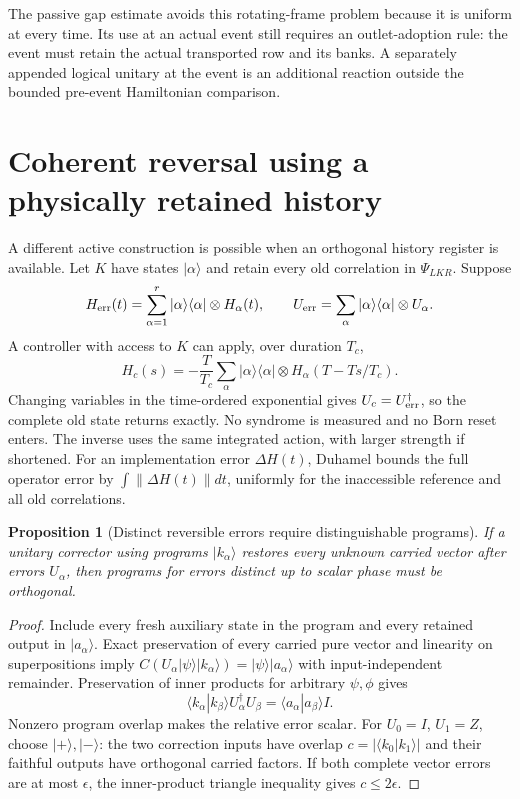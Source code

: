 \documentclass[11pt,oneside,openany]{book}
\newtheorem{proposition}[theorem]{Proposition}
\theoremstyle{definition}
\theoremstyle{remark}\newtheorem{remark}[theorem]{Remark}
\begin{document}
The passive gap estimate avoids this rotating-frame problem because it is uniform at every time. Its use at an actual event still requires an outlet-adoption rule: the event must retain the actual transported row and its banks. A separately appended logical unitary at the event is an additional reaction outside the bounded pre-event Hamiltonian comparison.

\section{Coherent reversal using a physically retained history}

A different active construction is possible when an orthogonal history register is available. Let $K$ have states $|\alpha\rangle$ and retain every old correlation in $\Psi_{LKR}$. Suppose
\[
 H_{\rm err}(t)=\sum_{\alpha=1}^r|\alpha\rangle\langle\alpha|\otimes H_\alpha(t),
 \qquad U_{\rm err}=\sum_\alpha|\alpha\rangle\langle\alpha|\otimes U_\alpha.
\]
A controller with access to $K$ can apply, over duration $T_c$,
\[
 H_c(s)=-\frac T{T_c}\sum_\alpha|\alpha\rangle\langle\alpha|
             \otimes H_\alpha(T-Ts/T_c).
\]
Changing variables in the time-ordered exponential gives $U_c=U_{\rm err}^\dagger$, so the complete old state returns exactly. No syndrome is measured and no Born reset enters. The inverse uses the same integrated action, with larger strength if shortened. For an implementation error $\Delta H(t)$, Duhamel bounds the full operator error by $\int\|\Delta H(t)\|dt$, uniformly for the inaccessible reference and all old correlations.

\begin{proposition}[Distinct reversible errors require distinguishable programs]
\label{prot:programs}
If a unitary corrector using programs $|k_\alpha\rangle$ restores every unknown carried vector after errors $U_\alpha$, then programs for errors distinct up to scalar phase must be orthogonal.
\end{proposition}
\begin{proof}
Include every fresh auxiliary state in the program and every retained output in $|a_\alpha\rangle$. Exact preservation of every carried pure vector and linearity on superpositions imply
$C(U_\alpha|\psi\rangle|k_\alpha\rangle)=|\psi\rangle|a_\alpha\rangle$ with input-independent remainder. Preservation of inner products for arbitrary $\psi,\phi$ gives
\[
 \langle k_\alpha|k_\beta\rangle U_\alpha^\dagger U_\beta
                 =\langle a_\alpha|a_\beta\rangle I.
\]
Nonzero program overlap makes the relative error scalar. For $U_0=I$, $U_1=Z$, choose $|+\rangle,|-\rangle$: the two correction inputs have overlap $c=|\langle k_0|k_1\rangle|$ and their faithful outputs have orthogonal carried factors. If both complete vector errors are at most $\epsilon$, the inner-product triangle inequality gives $c\le2\epsilon$.
\end{proof}
\end{document}
